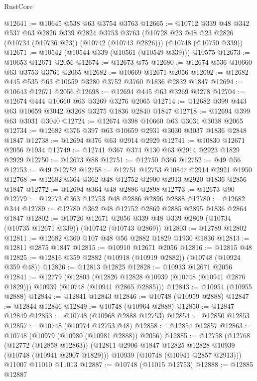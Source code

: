 \begin{lexlean}{RustCore}
\begin{coremodule}
@12641 := @10645 @538 @63 @3754 @3763
@12665 := @10712
    @339
    @48
    @342
    @537
    @63
    @2826
    @339
    @2824
    @3753
    @3763
    (@10728 @23 @48 @23 @2826 (@10734 (@10736 @23)) (@10742 (@10743 @2826)))
    (@10748 (@10750 @339))
@12671 := @10542 (@10544 @339 (@10561 (@10549 @339))) @10575
@12673 := @10653 @12671 @2056
@12674 := @12673 @75
@12680 := @12674 @536 @10660 @63 @3753 @3761 @2065
@12682 := @10669 @12671 @2056
@12692 := @12682 @445 @535 @63 @10659 @3280 @3752 @3760 @1836 @2832 @1847
@12694 := @10643 @12671 @2056
@12698 := @12694 @445 @63 @3269 @3278
@12704 := @12674 @444 @10660 @63 @3269 @3276 @2065
@12714 := @12682 @399 @443 @63 @10659 @3042 @3268 @3275 @1836 @2840 @1847
@12718 := @12694 @399 @63 @3031 @3040
@12724 := @12674 @398 @10660 @63 @3031 @3038 @2065
@12734 := @12682 @376 @397 @63 @10659 @2931 @3030 @3037 @1836 @2848 @1847
@12738 := @12694 @376 @63 @2914 @2929
@12741 := @10830 @12671 @2056 @1934
@12749 := @12741 @367 @374 @130 @63 @2914 @2923 @1829 @2929
@12750 := @12673 @88
@12751 := @12750 @366
@12752 := @49 @56
@12753 := @49 @12752
@12758 := @12751 @12753 @10847 @2914 @2921 @1950
@12768 := @12682 @364 @362 @48 @12752 @2900 @2913 @2920 @1836 @2856 @1847
@12772 := @12694 @364 @48 @2886 @2898
@12773 := @12673 @90
@12779 := @12773 @363 @12753 @48 @2886 @2896 @2888
@12780 := @12682 @344
@12789 := @12780 @362 @48 @12752 @2869 @2885 @2895 @1836 @2864 @1847
@12802 := @10726
    @12671
    @2056
    @339
    @48
    @339
    @2869
    (@10734 (@10735 @12671 @339))
    (@10742 (@10743 @2869))
@12803 := @12789 @12802
@12811 := @12682 @360 @107 @48 @56 @2882 @1829 @1930 @1836
@12813 := @12811 @2875 @1847
@12815 := @10910 @12671 @2056
@12816 := @12815 @48
@12825 := @12816 @359 @2882 (@10918 (@10919 @2882)) (@10748 (@10924 @359 @48))
@12826 := @12813 @12825
@12828 := @10933 @12671 @2056
@12841 := @12779
    (@12803
      (@12826 @12828 @10939 (@10748 (@10941 @2876 @1829)))
      @10939
      (@10748 (@10941 @2865 @2885)))
@12843 := @10954 (@10955 @2888)
@12844 := @12841 @12843
@12846 := @10748 (@10959 @2888)
@12847 := @12844 @12846
@12849 := @10748 (@10964 @2888)
@12850 := @12847 @12849
@12853 := @10748 (@10968 @2888 @12753)
@12854 := @12850 @12853
@12857 := @10748 (@10974 @12753 @48)
@12858 := @12854 @12857
@12863 := @10748 (@10979 (@10980 (@10981 @2888)) @2056)
@12885 := @12758
    (@12768
      (@12772 (@12858 @12863))
      (@12811 @2906 @1847 @12825 @12828 @10939 (@10748 (@10941 @2907 @1829)))
      @10939
      (@10748 (@10941 @2857 @2913)))
    @11007
    @11010
    @11013
@12887 := @10748 (@11015 @12753)
@12888 := @12885 @12887

\end{coremodule}
\end{lexlean}

